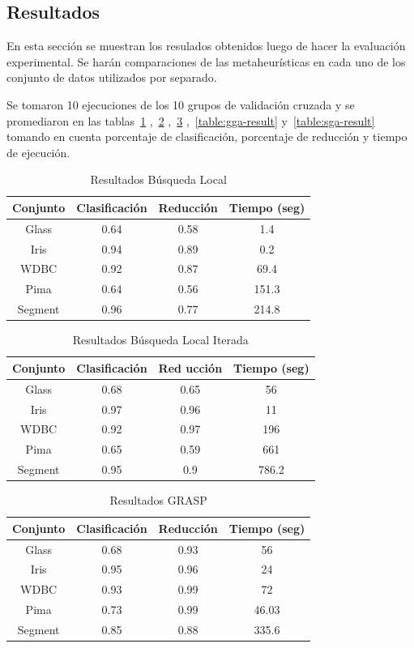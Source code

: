 \documentclass{ci5652}
\begin{document}
\subsection{Resultados}
En esta sección se muestran los resulados obtenidos luego de hacer la evaluación experimental. Se harán comparaciones de las metaheurísticas en cada uno de los conjunto de datos utilizados por separado.

Se tomaron 10 ejecuciones de los 10 grupos de validación cruzada y se promediaron en las tablas~\ref{table:ls-result} ,~\ref{table:ils-result} ,~\ref{table:grasp-result} ,~\ref{table:gga-result} y~\ref{table:sga-result} tomando en cuenta porcentaje de clasificación, porcentaje de reducción y tiempo de ejecución.

\begin{table}[!h]
	\centering
	\begin{tabular}{c c c c}
	\hline
	Conjunto & Clasificación & Reducción & Tiempo (seg) \\
	\hline
	Glass & 0.64 & 0.58 & 1.4 \\
	Iris & 0.94 & 0.89 & 0.2 \\
	WDBC & 0.92 & 0.87 & 69.4 \\
	Pima & 0.64 & 0.56 & 151.3 \\
	Segment & 0.96 & 0.77 & 214.8 \\
	\end{tabular}
	\caption{Resultados Búsqueda Local}
	\label{table:ls-result}
\end{table}


\begin{table}[!h]
	\centering
	\begin{tabular}{c c c c}
	\hline
	Conjunto & Clasificación & Red	ucción & Tiempo (seg) \\
	\hline
	Glass & 0.68 & 0.65 & 56 \\
	Iris & 0.97 & 0.96 & 11 \\
	WDBC & 0.92 & 0.97 & 196 \\
	Pima & 0.65 & 0.59 & 661 \\
	Segment & 0.95 & 0.9 & 786.2 \\
	\end{tabular}
	\caption{Resultados Búsqueda Local Iterada}
	\label{table:ils-result}
\end{table}


\begin{table}[!h]
	\centering
	\begin{tabular}{c c c c}
	\hline
	Conjunto & Clasificación & Reducción & Tiempo (seg) \\
	\hline
	Glass & 0.68 & 0.93 & 56 \\
	Iris & 0.95 & 0.96 & 24 \\
	WDBC & 0.93 & 0.99 & 72 \\
	Pima & 0.73 & 0.99 & 46.03 \\
	Segment & 0.85 & 0.88 & 335.6 \\
	\end{tabular}
	\caption{Resultados GRASP}
	\label{table:grasp-result}
\end{table}
\end{document}
